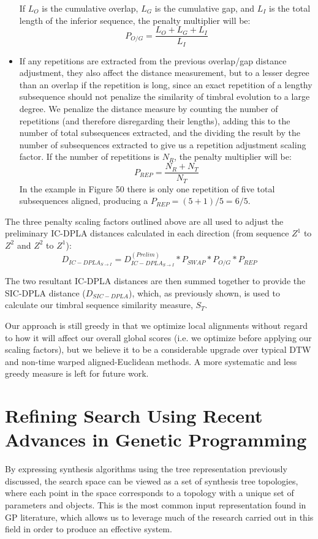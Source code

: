 \documentclass[12pt]{report} 	%
\numberwithin{figure}{chapter}
\numberwithin{table}{chapter}
\numberwithin{equation}{chapter}
\begin{document}
\begin{flushleft}
\begin{itemize}
\begin{figure}[h!]
\end{figure}
If $L_O$ is the cumulative overlap, $L_G$ is the cumulative gap, and $L_I$ is the total length of the inferior sequence, the penalty multiplier will be:
\begin{equation}
P_{O/G} = \frac{L_O+L_G+L_I}{L_I}
\end{equation}
\item If any repetitions are extracted from the previous overlap/gap distance adjustment, they also affect the distance measurement, but to a lesser degree than an overlap if the repetition is long, since an exact repetition of a lengthy subsequence should not penalize the similarity of timbral evolution to a large degree. We penalize the distance measure by counting the number of repetitions (and therefore disregarding their lengths), adding this to the number of total subsequences extracted, and the dividing the result by the number of subsequences extracted to give us a repetition adjustment scaling factor. If the number of repetitions is $N_R$, the penalty multiplier will be:
\begin{equation}
P_{REP} = \frac{N_R+N_T}{N_T}
\end{equation}
In the example in Figure 50 there is only one repetition of five total subsequences aligned, producing a $P_{REP}=(5+1)/5=6/5$.
\end{itemize}

The three penalty scaling factors outlined above are all used to adjust the preliminary IC-DPLA distances calculated in each direction (from sequence $Z^1$ to $Z^2$ and $Z^2$ to $Z^1$):
\begin{equation}
D_{IC-DPLA_{S \to I}} = D_{IC-DPLA_{S \to I}}^{(Prelim)} * P_{SWAP} * P_{O/G} * P_{REP}
\end{equation}

The two resultant IC-DPLA distances are then summed together to provide the SIC-DPLA distance ($D_{SIC-DPLA}$), which, as previously shown, is used to calculate our timbral sequence similarity measure, $S_T$.

Our approach is still greedy in that we optimize local alignments without regard to how it will affect our overall global scores (i.e. we optimize before applying our scaling factors), but we believe it to be a considerable upgrade over typical DTW and non-time warped aligned-Euclidean methods. A more systematic and less greedy measure is left for future work.

\section{Refining Search Using Recent Advances in Genetic Programming}
By expressing synthesis algorithms using the tree representation previously discussed, the search space can be viewed as a set of synthesis tree topologies, where each point in the space corresponds to a topology with a unique set of parameters and objects. This is the most common input representation found in GP literature, which allows us to leverage much of the research carried out in this field in order to produce an effective system.


\end{flushleft}
\end{document}
